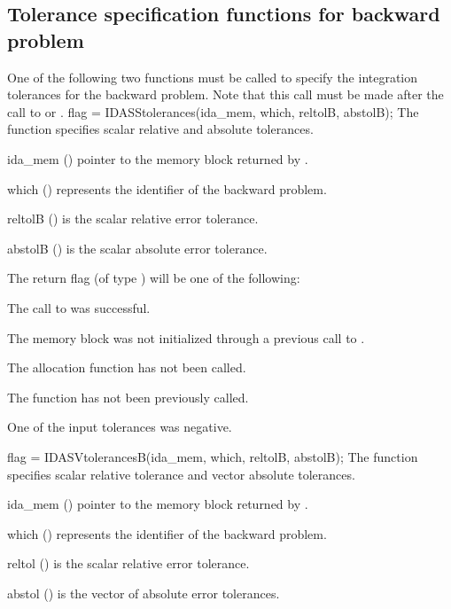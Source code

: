 \subsection{Tolerance specification functions for backward problem}
\label{sss:idatolerances_b}
One of the following two functions must be called to specify the integration 
tolerances for the backward problem. Note that this call must be made after the 
call to  or .
{
  flag = IDASStolerances(ida\_mem, which, reltolB, abstolB);
}
{
  The function  specifies scalar relative and absolute
  tolerances.
}
{
  \begin{args}
  \item[ida\_mem] ()
    pointer to the {\idas} memory block returned by .
  \item[which] ()
    represents the identifier of the backward problem.
  \item[reltolB] ()
    is the scalar relative error tolerance.
  \item[abstolB] ()
    is the scalar absolute error tolerance.
  \end{args}
}
{
  The return flag  (of type ) will be one of the following:
  \begin{args}
  \item[\Id{IDA\_SUCCESS}]
    The call to  was successful.
  \item[\Id{IDA\_MEM\_NULL}] 
    The {\idas} memory block was not initialized through a previous call to
    .
  \item[\Id{IDA\_NO\_MALLOC}] 
    The allocation function  has not been called.
  \item[\Id{IDA\_NO\_ADJ}]
    The function  has not been previously called.
  \item[\Id{IDA\_ILL\_INPUT}] 
    One of the input tolerances was negative.
  \end{args}
}
{}
{
  flag = IDASVtolerancesB(ida\_mem, which, reltolB, abstolB);
}
{
  The function  specifies scalar relative tolerance and
  vector absolute tolerances.
}
{
  \begin{args}
  \item[ida\_mem] ()
    pointer to the {\idas} memory block returned by .
  \item[which] ()
    represents the identifier of the backward problem.
  \item[reltol] ()
    is the scalar relative error tolerance.
  \item[abstol] ()
    is the vector of absolute error tolerances.
  \end{args}
}
